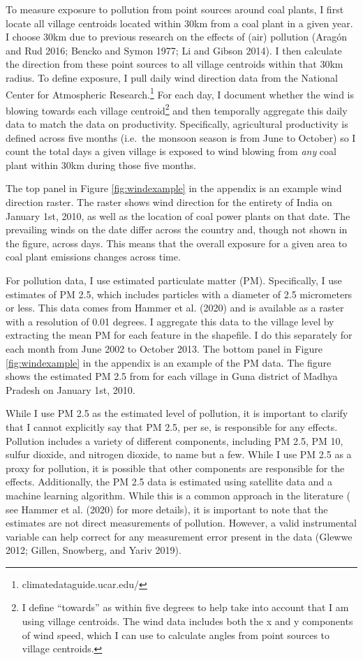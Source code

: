 \documentclass[
]{article}
\begin{document}
To measure exposure to pollution from point sources around coal plants, I first locate all village centroids located within 30km from a coal plant in a given year. I choose 30km due to previous research on the effects of (air) pollution (Aragón and Rud 2016; Bencko and Symon 1977; Li and Gibson 2014). I then calculate the direction from these point sources to all village centroids within that 30km radius. To define exposure, I pull daily wind direction data from the National Center for Atmospheric Research.\footnote{climatedataguide.ucar.edu/} For each day, I document whether the wind is blowing towards each village centroid\footnote{I define ``towards'' as within five degrees to help take into account that I am using village centroids. The wind data includes both the x and y components of wind speed, which I can use to calculate angles from point sources to village centroids.} and then temporally aggregate this daily data to match the data on productivity. Specifically, agricultural productivity is defined across five months (i.e.~the monsoon season is from June to October) so I count the total days a given village is exposed to wind blowing from \emph{any} coal plant within 30km during those five months.

The top panel in Figure \ref{fig:windexample} in the appendix is an example wind direction raster. The raster shows wind direction for the entirety of India on January 1st, 2010, as well as the location of coal power plants on that date. The prevailing winds on the date differ across the country and, though not shown in the figure, across days. This means that the overall exposure for a given area to coal plant emissions changes across time.

For pollution data, I use estimated particulate matter (PM). Specifically, I use estimates of PM 2.5, which includes particles with a diameter of 2.5 micrometers or less. This data comes from Hammer et al. (2020) and is available as a raster with a resolution of 0.01 degrees. I aggregate this data to the village level by extracting the mean PM for each feature in the shapefile. I do this separately for each month from June 2002 to October 2013. The bottom panel in Figure \ref{fig:windexample} in the appendix is an example of the PM data. The figure shows the estimated PM 2.5 from for each village in Guna district of Madhya Pradesh on January 1st, 2010.

While I use PM 2.5 as the estimated level of pollution, it is important to clarify that I cannot explicitly say that PM 2.5, per se, is responsible for any effects. Pollution includes a variety of different components, including PM 2.5, PM 10, sulfur dioxide, and nitrogen dioxide, to name but a few. While I use PM 2.5 as a proxy for pollution, it is possible that other components are responsible for the effects. Additionally, the PM 2.5 data is estimated using satellite data and a machine learning algorithm. While this is a common approach in the literature ( see Hammer et al. (2020) for more details), it is important to note that the estimates are not direct measurements of pollution. However, a valid instrumental variable can help correct for any measurement error present in the data (Glewwe 2012; Gillen, Snowberg, and Yariv 2019).
\end{document}
